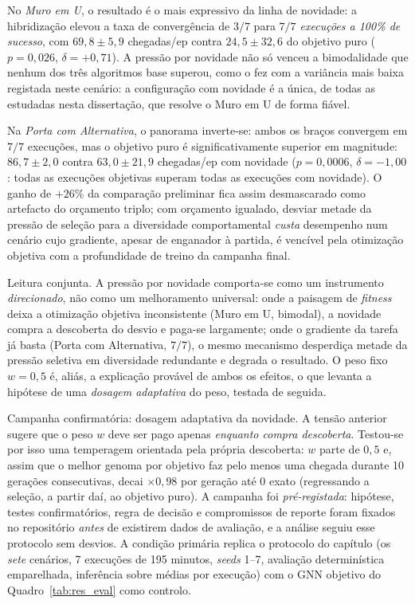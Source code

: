 \documentclass[12pt,reqno, twoside]{amsbook}
\makeatletter
\def\paragraph{\@startsection{paragraph}{4}%
  \z@\z@{-\fontdimen2\font}%
  {\normalfont\bfseries}}
\theoremstyle{plain}
\numberwithin{equation}{chapter}
\numberwithin{section}{chapter}
\numberwithin{table}{chapter}
\numberwithin{figure}{chapter}
\makeatother
\begin{document}
No \emph{Muro em U}, o resultado é o mais expressivo da linha de novidade: a hibridização elevou a taxa de convergência de $3/7$ para \emph{$7/7$ execuções a 100\% de sucesso}, com $69{,}8 \pm 5{,}9$ chegadas/ep contra $24{,}5 \pm 32{,}6$ do objetivo puro ($p = 0{,}026$, $\delta = +0{,}71$). A pressão por novidade não só venceu a bimodalidade que nenhum dos três algoritmos base superou, como o fez com a variância mais baixa registada neste cenário: a configuração com novidade é a única, de todas as estudadas nesta dissertação, que resolve o Muro em U de forma fiável.

Na \emph{Porta com Alternativa}, o panorama inverte-se: ambos os braços convergem em $7/7$ execuções, mas o objetivo puro é significativamente superior em magnitude: $86{,}7 \pm 2{,}0$ contra $63{,}0 \pm 21{,}9$ chegadas/ep com novidade ($p = 0{,}0006$, $\delta = -1{,}00$: todas as execuções objetivas superam todas as execuções com novidade). O ganho de $+26\%$ da comparação preliminar fica assim desmascarado como artefacto do orçamento triplo; com orçamento igualado, desviar metade da pressão de seleção para a diversidade comportamental \emph{custa} desempenho num cenário cujo gradiente, apesar de enganador à partida, é vencível pela otimização objetiva com a profundidade de treino da campanha final.

\paragraph{Leitura conjunta.} A pressão por novidade comporta-se como um instrumento \emph{direcionado}, não como um melhoramento universal: onde a paisagem de \textit{fitness} deixa a otimização objetiva inconsistente (Muro em U, bimodal), a novidade compra a descoberta do desvio e paga-se largamente; onde o gradiente da tarefa já basta (Porta com Alternativa, $7/7$), o mesmo mecanismo desperdiça metade da pressão seletiva em diversidade redundante e degrada o resultado. O peso fixo $w=0{,}5$ é, aliás, a explicação provável de ambos os efeitos, o que levanta a hipótese de uma \emph{dosagem adaptativa} do peso, testada de seguida.

\paragraph{Campanha confirmatória: dosagem adaptativa da novidade.} A tensão anterior sugere que o peso $w$ deve ser pago apenas \emph{enquanto compra descoberta}. Testou-se por isso uma temperagem orientada pela própria descoberta: $w$ parte de $0{,}5$ e, assim que o melhor genoma por objetivo faz pelo menos uma chegada durante 10 gerações consecutivas, decai $\times 0{,}98$ por geração até $0$ exato (regressando a seleção, a partir daí, ao objetivo puro). A campanha foi \emph{pré-registada}: hipótese, testes confirmatórios, regra de decisão e compromissos de reporte foram fixados no repositório \emph{antes} de existirem dados de avaliação, e a análise seguiu esse protocolo sem desvios. A condição primária replica o protocolo do capítulo (os \emph{sete} cenários, 7 execuções de 195 minutos, \textit{seeds} 1--7, avaliação determinística emparelhada, inferência sobre médias por execução) com o GNN objetivo do Quadro~\ref{tab:res_eval} como controlo.
\end{document}
